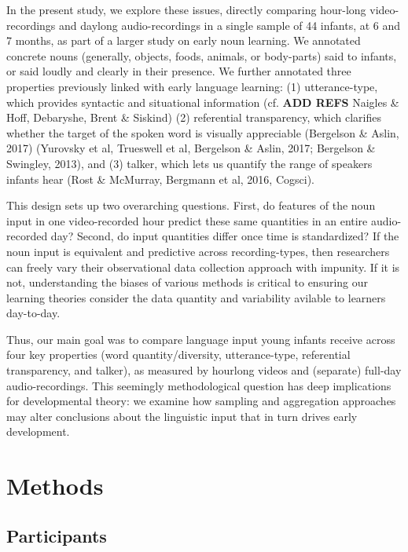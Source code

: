 \documentclass[floatsintext,man]{apa6}
\theoremstyle{definition}
\theoremstyle{definition}
\theoremstyle{definition}
\theoremstyle{remark}
\begin{document}
In the present study, we explore these issues, directly comparing
hour-long video-recordings and daylong audio-recordings in a single
sample of 44 infants, at 6 and 7 months, as part of a larger study on
early noun learning. We annotated concrete nouns (generally, objects,
foods, animals, or body-parts) said to infants, or said loudly and
clearly in their presence. We further annotated three properties
previously linked with early language learning: (1) utterance-type,
which provides syntactic and situational information (cf. \textbf{ADD
REFS} Naigles \& Hoff, Debaryshe, Brent \& Siskind) (2) referential
transparency, which clarifies whether the target of the spoken word is
visually appreciable (Bergelson \& Aslin, 2017) (Yurovsky et al,
Trueswell et al, Bergelson \& Aslin, 2017; Bergelson \& Swingley, 2013),
and (3) talker, which lets us quantify the range of speakers infants
hear (Rost \& McMurray, Bergmann et al, 2016, Cogsci).

This design sets up two overarching questions. First, do features of the
noun input in one video-recorded hour predict these same quantities in
an entire audio-recorded day? Second, do input quantities differ once
time is standardized? If the noun input is equivalent and predictive
across recording-types, then researchers can freely vary their
observational data collection approach with impunity. If it is not,
understanding the biases of various methods is critical to ensuring our
learning theories consider the data quantity and variability avilable to
learners day-to-day.

Thus, our main goal was to compare language input young infants receive
across four key properties (word quantity/diversity, utterance-type,
referential transparency, and talker), as measured by hourlong videos
and (separate) full-day audio-recordings. This seemingly methodological
question has deep implications for developmental theory: we examine how
sampling and aggregation approaches may alter conclusions about the
linguistic input that in turn drives early development.

\section{Methods}\label{methods}

\subsection{Participants}\label{participants}
\end{document}
